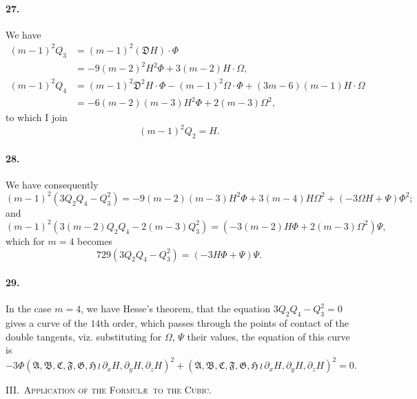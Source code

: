\documentclass[11pt,a4paper]{book}
\begin{document}
\paragraph{27.}
We  have
\begin{align*}
(m-1)^2 Q_3 &= (m-1)^2 (\mathfrak{D} H) \cdot \Phi \\
&= -9(m-2)^2 H^2 \Phi + 3(m-2)H \cdot \Omega, \\
(m-1)^2 Q_4 &= (m-1)^2 \mathfrak{D}^2 H \cdot \Phi - (m-1)^2 \Omega \cdot \Phi + (3m-6)(m-1) H \cdot \Omega \\
&= -6(m-2)(m-3) H^2 \Phi + 2(m-3) \Omega^2,
\end{align*}
to  which  I  join
\[
(m-1)^2 Q_2 = H.
\]

\paragraph{28.}
We  have  consequently
\[
(m-1)^2 (3Q_2 Q_4 - Q_3^2) = -9(m-2)(m-3) H^2 \Phi + 3(m-4) H \Omega^2 + (-3\Omega H + \Psi) \Phi^2;
\]
and
\[
(m-1)^2 (3(m-2)Q_2 Q_4 - 2(m-3)Q_3^2) = (-3(m-2)H \Phi + 2(m-3)\Omega^2) \Psi,
\]
which  for  $m = 4$  becomes
\[
729(3Q_2 Q_4 - Q_3^2) = (-3H \Phi + \Psi) \Psi.
\]

\paragraph{29.}
In  the  case  $m = 4$,  we  have  Hesse's  theorem,  that  the  equation  $3Q_2 Q_4 - Q_3^2 = 0$
gives  a  curve  of  the  $14$th  order,  which  passes  through  the  points  of  contact  of  the
double  tangents,  viz.  substituting  for  $\Omega$,  $\Psi$  their  values,  the  equation  of  this  curve  is
\[
-3\Phi (\mathfrak{A}, \mathfrak{B}, \mathfrak{C}, \mathfrak{F}, \mathfrak{G}, \mathfrak{H} \,\!\!\wr\, \partial_x H, \partial_y H, \partial_z H)^2
+ (\mathfrak{A}, \mathfrak{B}, \mathfrak{C}, \mathfrak{F}, \mathfrak{G}, \mathfrak{H} \,\!\!\wr\, \partial_x H, \partial_y H, \partial_z H)^2 = 0.
\]

\newpage
\noindent\textsc{III.~Application  of  the  Formul\ae\ to  the  Cubic.}
\end{document}
